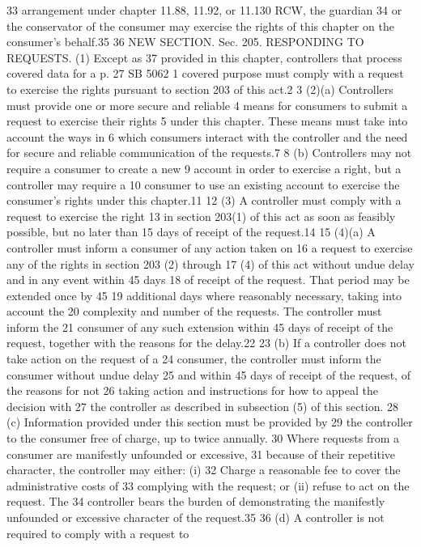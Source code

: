 33 arrangement under chapter 11.88, 11.92, or 11.130 RCW, the guardian
34 or the conservator of the consumer may exercise the rights of this
chapter on the consumer's behalf.35
36 NEW SECTION. Sec. 205. RESPONDING TO REQUESTS. (1) Except as
37 provided in this chapter, controllers that process covered data for a
p. 27 SB 5062
1 covered purpose must comply with a request to exercise the rights
pursuant to section 203 of this act.2
3 (2)(a) Controllers must provide one or more secure and reliable
4 means for consumers to submit a request to exercise their rights
5 under this chapter. These means must take into account the ways in
6 which consumers interact with the controller and the need for secure
and reliable communication of the requests.7
8 (b) Controllers may not require a consumer to create a new
9 account in order to exercise a right, but a controller may require a
10 consumer to use an existing account to exercise the consumer's rights
under this chapter.11
12 (3) A controller must comply with a request to exercise the right
13 in section 203(1) of this act as soon as feasibly possible, but no
later than 15 days of receipt of the request.14
15 (4)(a) A controller must inform a consumer of any action taken on
16 a request to exercise any of the rights in section 203 (2) through
17 (4) of this act without undue delay and in any event within 45 days
18 of receipt of the request. That period may be extended once by 45
19 additional days where reasonably necessary, taking into account the
20 complexity and number of the requests. The controller must inform the
21 consumer of any such extension within 45 days of receipt of the
request, together with the reasons for the delay.22
23 (b) If a controller does not take action on the request of a
24 consumer, the controller must inform the consumer without undue delay
25 and within 45 days of receipt of the request, of the reasons for not
26 taking action and instructions for how to appeal the decision with
27 the controller as described in subsection (5) of this section.
28 (c) Information provided under this section must be provided by
29 the controller to the consumer free of charge, up to twice annually.
30 Where requests from a consumer are manifestly unfounded or excessive,
31 because of their repetitive character, the controller may either: (i)
32 Charge a reasonable fee to cover the administrative costs of
33 complying with the request; or (ii) refuse to act on the request. The
34 controller bears the burden of demonstrating the manifestly unfounded
or excessive character of the request.35
36 (d) A controller is not required to comply with a request to
